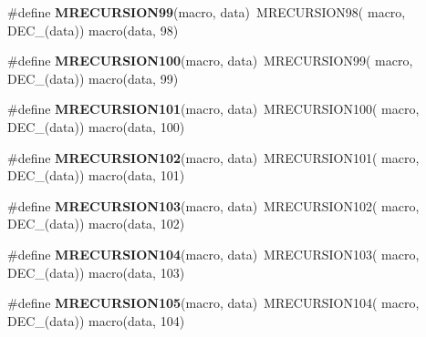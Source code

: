 \begin{DoxyCompactItemize}
\item 
\hypertarget{group__group__sam0__utils__mrecursion_ga49ea729b9d1196d0bb2b9d35834bdcd8}{}\#define {\bfseries M\+R\+E\+C\+U\+R\+S\+I\+O\+N99}(macro,  data)~M\+R\+E\+C\+U\+R\+S\+I\+O\+N98(  macro, D\+E\+C\+\_\+(data))   macro(data, 98)\label{group__group__sam0__utils__mrecursion_ga49ea729b9d1196d0bb2b9d35834bdcd8}

\item 
\hypertarget{group__group__sam0__utils__mrecursion_ga858f2b3d9b3437edb4fc4fd519c4fee7}{}\#define {\bfseries M\+R\+E\+C\+U\+R\+S\+I\+O\+N100}(macro,  data)~M\+R\+E\+C\+U\+R\+S\+I\+O\+N99(  macro, D\+E\+C\+\_\+(data))   macro(data, 99)\label{group__group__sam0__utils__mrecursion_ga858f2b3d9b3437edb4fc4fd519c4fee7}

\item 
\hypertarget{group__group__sam0__utils__mrecursion_gae895878fcdbb1862624dd17835337f7e}{}\#define {\bfseries M\+R\+E\+C\+U\+R\+S\+I\+O\+N101}(macro,  data)~M\+R\+E\+C\+U\+R\+S\+I\+O\+N100(  macro, D\+E\+C\+\_\+(data))   macro(data, 100)\label{group__group__sam0__utils__mrecursion_gae895878fcdbb1862624dd17835337f7e}

\item 
\hypertarget{group__group__sam0__utils__mrecursion_gae7ed0e33ac140200e71c2a57234c08aa}{}\#define {\bfseries M\+R\+E\+C\+U\+R\+S\+I\+O\+N102}(macro,  data)~M\+R\+E\+C\+U\+R\+S\+I\+O\+N101(  macro, D\+E\+C\+\_\+(data))   macro(data, 101)\label{group__group__sam0__utils__mrecursion_gae7ed0e33ac140200e71c2a57234c08aa}

\item 
\hypertarget{group__group__sam0__utils__mrecursion_ga387fb40ce19de11aa90d6aa2a331110f}{}\#define {\bfseries M\+R\+E\+C\+U\+R\+S\+I\+O\+N103}(macro,  data)~M\+R\+E\+C\+U\+R\+S\+I\+O\+N102(  macro, D\+E\+C\+\_\+(data))   macro(data, 102)\label{group__group__sam0__utils__mrecursion_ga387fb40ce19de11aa90d6aa2a331110f}

\item 
\hypertarget{group__group__sam0__utils__mrecursion_ga25a6fddabb19c7e2b9d332ca28726ab8}{}\#define {\bfseries M\+R\+E\+C\+U\+R\+S\+I\+O\+N104}(macro,  data)~M\+R\+E\+C\+U\+R\+S\+I\+O\+N103(  macro, D\+E\+C\+\_\+(data))   macro(data, 103)\label{group__group__sam0__utils__mrecursion_ga25a6fddabb19c7e2b9d332ca28726ab8}

\item 
\hypertarget{group__group__sam0__utils__mrecursion_ga80adb30156191477474dbaaea95ae1cd}{}\#define {\bfseries M\+R\+E\+C\+U\+R\+S\+I\+O\+N105}(macro,  data)~M\+R\+E\+C\+U\+R\+S\+I\+O\+N104(  macro, D\+E\+C\+\_\+(data))   macro(data, 104)\label{group__group__sam0__utils__mrecursion_ga80adb30156191477474dbaaea95ae1cd}


\end{DoxyCompactItemize}
